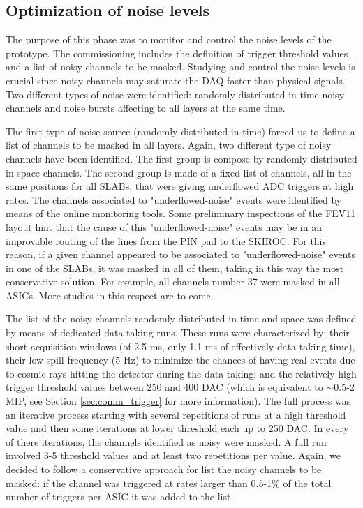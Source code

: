 \documentclass[a4paper,11pt]{article}
\begin{document}
\subsection{Optimization of noise levels}
\label{sec:comm_noise}

The purpose of this phase was to monitor and control the
noise levels of the prototype. The commissioning includes the definition of trigger threshold values and a list of noisy channels to be masked.
Studying and control the noise levels
is crucial since noisy channels may saturate the DAQ faster than physical signals.
Two different types of noise were identified:
randomly distributed in time noisy channels 
and noise bursts affecting to all layers at the same time.

The first type of noise source (randomly distributed in time)
forced us to define a list of channels to be masked in all 
layers. Again, two different type of noisy channels have been identified. 
The first group is compose by randomly distributed in space channels.
The second group is made of
a fixed list of channels, all in the same positions for all SLABs, that were giving
underflowed ADC triggers at high rates. 
The channels associated to "underflowed-noise" events were identified by means of the online monitoring
tools. Some preliminary inspections of the FEV11 layout hint that
the cause of this "underflowed-noise" events may be in an improvable routing of the
lines from the PIN pad to the SKIROC. 
For this reason, if a given channel appeared to be associated 
to "underflowed-noise" events in one of the SLABs, 
it was masked in all of them, taking in this way the most conservative solution.
For example, all channels number 37 were masked in all ASICs.
More studies in this respect are to come.

The list of the noisy channels randomly distributed in time and space was
defined by means of dedicated data taking runs. 
These runs were characterized by: their short acquisition windows (of 2.5 ms, only 1.1 ms 
of effectively data taking time), their low
spill frequency (5 Hz) to minimize the chances of having real events due to cosmic rays 
hitting the detector during the
data taking; and the relatively high trigger threshold values between 250 and 400 DAC 
(which is equivalent to $\sim$0.5-2 MIP, see Section \ref{sec:comm_trigger} for more 
information). The full process was an iterative process starting with several repetitions
of runs at a high threshold value and then some iterations at lower threshold each up to 250 DAC. 
In every of there iterations, the channels identified as noisy were masked.
A full run involved 3-5 threshold values and at least two repetitions per value.
Again, we decided to follow a conservative approach for list the noisy channels to be masked:
if the channel was triggered at rates larger than 0.5-1\% of the total number of triggers per ASIC
it was added to the list.
\end{document}
